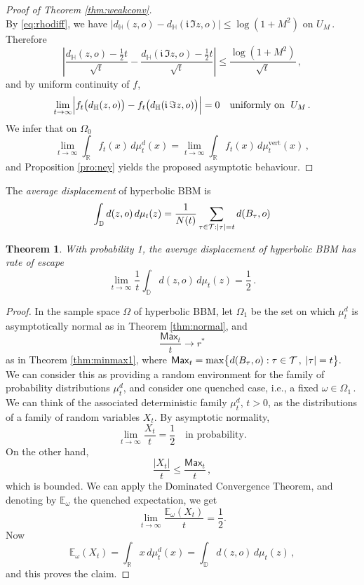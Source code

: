 \documentclass[12pt]{amsart}
\newcommand\BB{\textit{\textbf{B}}}
\newcommand\E{\mathbb E}
\newcommand\DD{\mathbb D}
\newcommand\HH{\mathbb H}
\newcommand\im{\mathfrak{i}\,}
\newcommand\nn{N}
\newcommand\R{\mathbb R}
\newcommand\ro{d}
\newcommand\T{\mathcal T}
\newtheorem{theorem}{Theorem}%
\numberwithin{theorem}{section}
\theoremstyle{definition}
\begin{document}
\begin{proof}[Proof of Theorem \ref{thm:weakconv}]
$$$$   
By \eqref{eq:rhodiff}, we have $|\ro_{\HH}(z,o)-\ro_{\HH}(\im \Im z,o)| \le \log(1+M^2)$ on $U_M\,$.
Therefore 
$$
\left|\frac{\ro_{\HH}(z,o)-\frac12 t}{\sqrt{t}} 
- \frac{\ro_{\HH}(\im \Im z,o)-\frac12 t}{\sqrt{t}}\right| \le \frac{\log(1+M^2)}{\sqrt{t}}\,, 
$$
and by uniform continuity of $f$, 
$$
\lim_{t \to \infty} \Bigl|f_t\bigl(\ro_{\HH}(z,o)\bigr) 
   - f_t\bigl(\ro_{\HH}(\im \Im z,o)\bigr) \Bigr| = 0 \quad \text{uniformly on }\; U_M\,.
$$
We infer that on $\Omega_0$
$$
\lim_{t \to \infty} \int_{\R} f_t(x) \, d\mu_t^{\ro}(x) =
\lim_{t \to \infty} \int_{\R} f_t(x) \, d\mu_t^{\text{vert}}(x)\,,
$$
and Proposition \ref{pro:ney} yields the proposed asymptotic behaviour.
\end{proof}

The \emph{average displacement} of hyperbolic BBM is
$$ 
\int_{\DD} \ro(z,o)\,d\mu_t(z) 
= \frac{1}{\nn(t)}\sum_{\tau \in \T: |\tau| = t} \ro(\BB_{\tau},o)
$$ 

\begin{theorem}\label{thm:escape} With probability 1, the average displacement of hyperbolic BBM
has rate of escape
$$
\lim_{t \to \infty} \frac{1}{t}\int_{\DD} \ro(z,o)\,d\mu_t(z) = \frac12\,. 
$$
\end{theorem}

\begin{proof}
In the sample space $\Omega$ of hyperbolic BBM, let $\Omega_1$ be the set on which
$\mu_t^{\ro}$ is asymptotically normal as in Theorem \ref{thm:normal}, and 
$$
\frac{\mathsf{Max}_t}{t} \to r^*
$$
as in Theorem \ref{thm:minmax1}, where
$
\mathsf{Max}_t = \max \bigl\{ \ro(\BB_{\tau},o) : \tau \in \T\,,\; |\tau| = t \bigr\}. 
$ 
We can consider this as providing a random environment for the 
family of probability distributions $\mu_t^{\ro}$, and consider one quenched
case, i.e., a fixed $\omega \in \Omega_1\,$. We can think of the associated
deterministic family $\mu_t^{\ro}$, $t > 0$, as the distributions of a 
family of random variables $X_t$. By asymptotic normality, 
$$
\lim_{t \to \infty} \frac{X_t}{t} = \frac{1}{2}\quad \text{in probability.} 
$$
On the other hand, 
$$
\frac{|X_t|}{t} \le \frac{\mathsf{Max}_t}{t}\,, 
$$
which is bounded. We can apply
the Dominated Convergence Theorem, and denoting by $\E_{\omega}$ the
quenched expectation, we get 
$$
\lim_{t \to \infty} \frac{\E_{\omega}(X_t)}{t} = \frac{1}{2}.
$$
Now 
$$
\E_{\omega}(X_t) = \int_{\R} x \,d\mu_t^{\ro}(x)
= \int_{\DD} \ro(z,o)\,d\mu_t(z)\,,
$$
and this proves the claim.
\end{proof}
\end{document}

